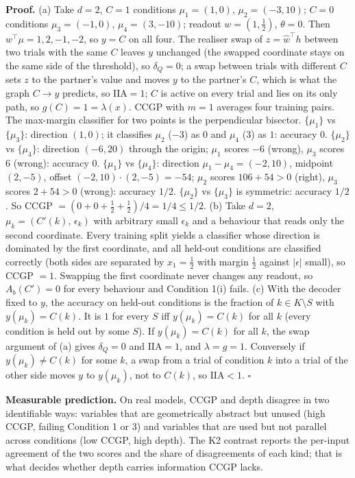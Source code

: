\textbf{Proof.} (a) Take $d=2$, $C=1$ conditions $\mu_1=(1,0)$,
$\mu_2=(-3,10)$; $C=0$ conditions $\mu_3=(-1,0)$, $\mu_4=(3,-10)$; readout
$w=(1,\tfrac12)$, $\theta=0$. Then $w^\top\mu=1,2,-1,-2$, so $y=C$ on all four.
The realiser swap of $z=\hat w^\top h$ between two trials with the same $C$
leaves $y$ unchanged (the swapped coordinate stays on the same side of the
threshold), so $\delta_Q=0$; a swap between trials with different $C$ sets
$z$ to the partner's value and moves $y$ to the partner's $C$, which is what
the graph $C\to y$ predicts, so $\mathrm{IIA}=1$; $C$ is active on every
trial and lies on its only path, so $g(C)=1=\lambda(x)$. CCGP with $m=1$
averages four training pairs. The max-margin classifier for two points is the
perpendicular bisector. $\{\mu_1\}$ vs $\{\mu_3\}$: direction $(1,0)$; it
classifies $\mu_2$ ($-3$) as $0$ and $\mu_4$ ($3$) as $1$: accuracy $0$.
$\{\mu_2\}$ vs $\{\mu_4\}$: direction $(-6,20)$ through the origin; $\mu_1$
scores $-6$ (wrong), $\mu_3$ scores $6$ (wrong): accuracy $0$.
$\{\mu_1\}$ vs $\{\mu_4\}$: direction $\mu_1-\mu_4=(-2,10)$, midpoint
$(2,-5)$, offset $(-2,10)\cdot(2,-5)=-54$; $\mu_2$ scores $106+54>0$ (right),
$\mu_3$ scores $2+54>0$ (wrong): accuracy $1/2$. $\{\mu_2\}$ vs $\{\mu_3\}$
is symmetric: accuracy $1/2$. So CCGP $=(0+0+\tfrac12+\tfrac12)/4=1/4\le1/2$.
(b) Take $d=2$, $\mu_k=(C'(k),\,\epsilon_k)$ with arbitrary small $\epsilon_k$
and a behaviour that reads only the second coordinate. Every training split
yields a classifier whose direction is dominated by the first coordinate, and
all held-out conditions are classified correctly (both sides are separated
by $x_1=\tfrac12$ with margin $\tfrac12$ against $|\epsilon|$ small), so
CCGP $=1$. Swapping the first coordinate never changes any readout, so
$A_b(C')=0$ for every behaviour and Condition 1(i) fails.
(c) With the decoder fixed to $y$, the accuracy on held-out conditions is
the fraction of $k\in K\setminus S$ with $y(\mu_k)=C(k)$. It is $1$ for every
$S$ iff $y(\mu_k)=C(k)$ for all $k$ (every condition is held out by some
$S$). If $y(\mu_k)=C(k)$ for all $k$, the swap argument of (a) gives
$\delta_Q=0$ and $\mathrm{IIA}=1$, and $\lambda=g=1$. Conversely if
$y(\mu_k)\ne C(k)$ for some $k$, a swap from a trial of condition $k$ into a
trial of the other side moves $y$ to $y(\mu_k)$, not to $C(k)$, so
$\mathrm{IIA}<1$. \hfill$\square$

\textbf{Measurable prediction.} On real models, CCGP and depth disagree in
two identifiable ways: variables that are geometrically abstract but unused
(high CCGP, failing Condition 1 or 3) and variables that are used but not
parallel across conditions (low CCGP, high depth). The K2 contrast reports
the per-input agreement of the two scores and the share of disagreements of
each kind; that is what decides whether depth carries information CCGP lacks.
